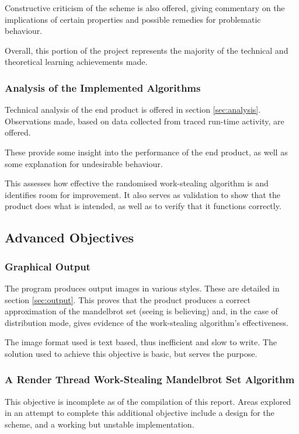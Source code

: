     Constructive criticism of the scheme is also offered, giving commentary on the implications of certain properties and possible
    remedies for problematic behaviour.
    
    Overall, this portion of the project represents the majority of the technical and theoretical learning achievements made.
    
\subsubsection*{Analysis of the Implemented Algorithms}
    Technical analysis of the end product is offered in section \ref{sec:analysis}.
    Observations made, based on data collected from traced run-time activity, are offered.
    
    These provide some insight into the performance of the end product, as well as some explanation for
    undesirable behaviour.

    This assesses how effective the randomised work-stealing algorithm is and identifies room for improvement.
    It also serves as validation to show that the product does what is intended, as well as to verify that it functions correctly.

\subsection*{Advanced Objectives}
\subsubsection*{Graphical Output}
    The program produces output images in various styles. These are detailed in section \ref{sec:output}.
    This proves that the product produces a correct approximation of the mandelbrot set (seeing is believing) and, in the 
    case of distribution mode, gives evidence of the work-stealing algorithm's effectiveness. 
    
    The image format used is text based, thus inefficient and slow to write. The solution used to achieve this objective is basic, but serves 
    the purpose.
    
\subsubsection*{A Render Thread Work-Stealing Mandelbrot Set Algorithm}
    This objective is incomplete as of the compilation of this report. 
    Areas explored in an attempt to complete this additional objective include
    a design for the scheme, and a working but unstable implementation.
    
